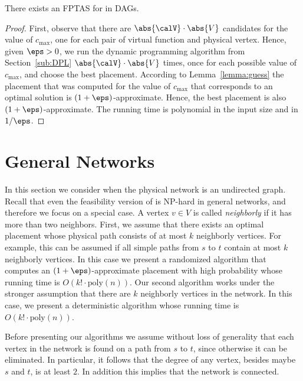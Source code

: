 \begin{theorem}
\label{thm:fptas}
There exists an FPTAS for \scp in DAGs.
\end{theorem}
\begin{proof}
First, observe that there are $\abs{\calV} \cdot \abs{V}$ candidates
for the value of $c_{\max}$, one for each pair of virtual function and
physical vertex.  
%
Hence, given $\eps>0$, we run the dynamic programming algorithm from
Section~\ref{sub:DPL} $\abs{\calV} \cdot \abs{V}$ times, once for each
possible value of $c_{\max}$, and choose the best placement.
%
According to Lemma~\ref{lemma:guess} the placement that was computed
for the value of $c_{\max}$ that corresponds to an optimal solution is
$(1+\eps)$-approximate.  Hence, the best placement is also
$(1+\eps)$-approximate.
%
The running time is polynomial in the input size and in $1/\eps$.
\end{proof}



\section{General Networks}
\label{sec:general}

In this section we consider \scp when the physical network is an
undirected graph.  Recall that even the feasibility version of \scp is
NP-hard in general networks, and therefore we focus on a special case.
%
A vertex $v \in V$ is called \emph{neighborly} if it has more than two
neighbors.
%
First, we assume that there exists an optimal placement whose physical
path consists of at most $k$ neighborly vertices.  For example, this
can be assumed if all simple paths from $s$ to $t$ contain at most $k$
neighborly vertices.  In this case we present a randomized algorithm
that computes an $(1+\eps)$-approximate placement with high
probability whose running time is $O(k! \cdot \text{poly}(n))$.
%
Our second algorithm works under the stronger assumption that there
are $k$ neighborly vertices in the network.  In this case, we present
a deterministic algorithm whose running time is $O(k! \cdot
\text{poly}(n))$.

Before presenting our algorithms we assume without loss of generality
that each vertex in the network is found on a path from $s$ to $t$,
since otherwise it can be eliminated.  In particular, it follows that
the degree of any vertex, besides maybe $s$ and $t$, is at least $2$.
In addition this implies that the network is connected.

